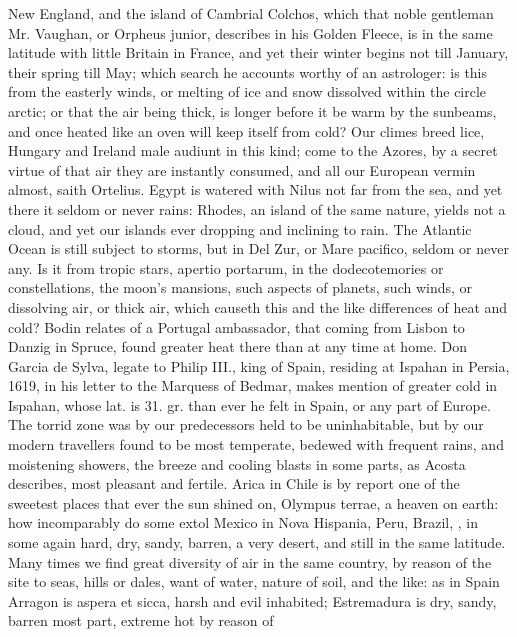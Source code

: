{New England, and the island of Cambrial Colchos, which that noble
gentleman Mr. Vaughan, or Orpheus junior, describes in his Golden
Fleece, is in the same latitude with little Britain in France, and yet
their winter begins not till January, their spring till May; which
search he accounts worthy of an astrologer: is this from the easterly
winds, or melting of ice and snow dissolved within the circle arctic;
or that the air being thick, is longer before it be warm by the
sunbeams, and once heated like an oven will keep itself from cold? Our
climes breed lice,  Hungary and Ireland male audiunt in this
kind; come to the Azores, by a secret virtue of that air they are
instantly consumed, and all our European vermin almost, saith Ortelius.
Egypt is watered with Nilus not far from the sea, and yet there it
seldom or never rains: Rhodes, an island of the same nature, yields not
a cloud, and yet our islands ever dropping and inclining to rain. The
Atlantic Ocean is still subject to storms, but in Del Zur, or Mare
pacifico, seldom or never any. Is it from tropic stars, apertio
portarum, in the dodecotemories or constellations, the moon's mansions,
such aspects of planets, such winds, or dissolving air, or thick air,
which causeth this and the like differences of heat and cold? Bodin
relates of a Portugal ambassador, that coming from Lisbon to
Danzig in Spruce, found greater heat there than at any time at
home. Don Garcia de Sylva, legate to Philip III., king of Spain,
residing at Ispahan in Persia, 1619, in his letter to the Marquess of
Bedmar, makes mention of greater cold in Ispahan, whose lat. is 31. gr.
than ever he felt in Spain, or any part of Europe. The torrid zone was
by our predecessors held to be uninhabitable, but by our modern
travellers found to be most temperate, bedewed with frequent rains, and
moistening showers, the breeze and cooling blasts in some parts, as
Acosta describes, most pleasant and fertile. Arica in Chile is by
report one of the sweetest places that ever the sun shined on, Olympus
terrae, a heaven on earth: how incomparably do some extol Mexico in
Nova Hispania, Peru, Brazil, \etc{}, in some again hard, dry, sandy,
barren, a very desert, and still in the same latitude. Many times we
find great diversity of air in the same country, by reason of the
site to seas, hills or dales, want of water, nature of soil, and the
like: as in Spain Arragon is aspera et sicca, harsh and evil inhabited;
Estremadura is dry, sandy, barren most part, extreme hot by reason of
}
